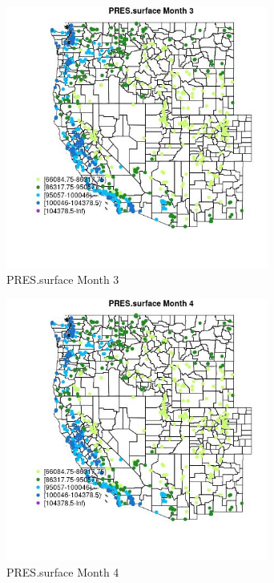 \begin{figure} 
\centering  
\includegraphics[width=0.77\textwidth]{Code_Outputs/Report_ML_input_PM25_Step4_part_f_de_duplicated_aveswNAs_MapObsMo3PRESsurface.jpg} 
\caption{\label{fig:Report_ML_input_PM25_Step4_part_f_de_duplicated_aveswNAsMapObsMo3PRESsurface}PRES.surface Month 3} 
\end{figure} 
 

\begin{figure} 
\centering  
\includegraphics[width=0.77\textwidth]{Code_Outputs/Report_ML_input_PM25_Step4_part_f_de_duplicated_aveswNAs_MapObsMo4PRESsurface.jpg} 
\caption{\label{fig:Report_ML_input_PM25_Step4_part_f_de_duplicated_aveswNAsMapObsMo4PRESsurface}PRES.surface Month 4} 
\end{figure} 
 

